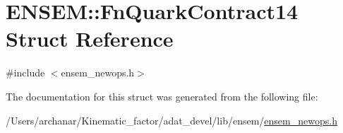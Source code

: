\hypertarget{structENSEM_1_1FnQuarkContract14}{}\section{E\+N\+S\+EM\+:\+:Fn\+Quark\+Contract14 Struct Reference}
\label{structENSEM_1_1FnQuarkContract14}


{\ttfamily \#include $<$ensem\+\_\+newops.\+h$>$}



The documentation for this struct was generated from the following file\+:\begin{DoxyCompactItemize}
\item 
/\+Users/archanar/\+Kinematic\+\_\+factor/adat\+\_\+devel/lib/ensem/\mbox{\hyperlink{lib_2ensem_2ensem__newops_8h}{ensem\+\_\+newops.\+h}}\end{DoxyCompactItemize}
